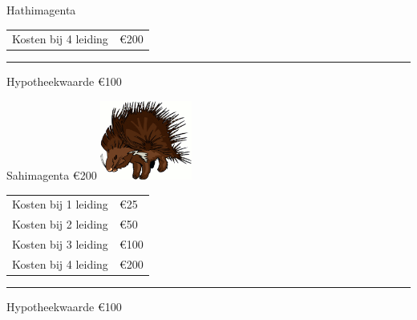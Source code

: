 \documentclass[11pt]{article}
\newcommand{\scheiding}{
    \rule[0.5ex]{\linewidth}{1pt}
}
\begin{document}
\begin{tcbraster}[raster columns=3, raster equal height, left=0mm, right=0mm,
                    raster column skip=0mm,
                    raster row skip=0mm,
                    sharp corners]
\begin{kaartje}{Hathi}{magenta}
\begin{tabular}{ll}
        Kosten bij 4 leiding & €200
    \end{tabular}
    \scheiding{}
    {\small Hypotheekwaarde €100}
\end{kaartje}
\begin{kaartje}{Sahi}{magenta}
    €200
    \tcblower{}
    \includegraphics[height=7em]{fig/sahi.png}
    \begin{tabular}{ll}
        Kosten bij 1 leiding & €25  \\
        Kosten bij 2 leiding & €50  \\
        Kosten bij 3 leiding & €100 \\
        Kosten bij 4 leiding & €200
    \end{tabular}
    \scheiding{}
    {\small Hypotheekwaarde €100}
\end{kaartje}
\end{tcbraster}
\end{document}
